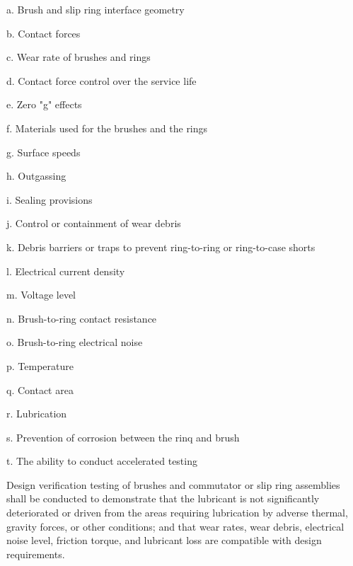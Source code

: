 \documentclass[12pt]{article}
\begin{document}
a. Brush and slip ring interface geometry

b. Contact forces

c. Wear rate of brushes and rings

d. Contact force control over the service life

e. Zero "g" effects

f. Materials used for the brushes and the rings

g. Surface speeds

h. Outgassing

i. Sealing provisions

j. Control or containment of wear debris

k. Debris barriers or traps to prevent ring-to-ring or ring-to-case shorts

l. Electrical current density

m. Voltage level

n. Brush-to-ring contact resistance

o. Brush-to-ring electrical noise

p. Temperature

q. Contact area

r. Lubrication

s. Prevention of corrosion between the rinq and brush

t. The ability to conduct accelerated testing

Design verification testing of brushes and commutator or slip ring assemblies shall be conducted to demonstrate that the lubricant is not significantly deteriorated or driven from the areas requiring lubrication by adverse thermal, gravity forces, or other conditions; and that wear rates, wear debris, electrical noise level, friction torque, and lubricant loss are compatible with design requirements.
\end{document}
